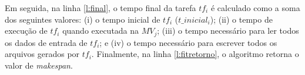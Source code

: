 Em seguida, na linha \ref{l:final}, o tempo final da tarefa $tf_i$ é calculado como a soma dos seguintes valores: (i) o tempo inicial de $tf_i$ ($t\_inicial_i$); (ii) o tempo de execução de $tf_i$ quando executada na $MV_j$; (iii) o tempo necessário para ler todos os dados de entrada de $tf_i$; e (iv) o tempo necessário para escrever todos os arquivos gerados por $tf_i$. Finalmente, na linha \ref{l:fitretorno}, o algoritmo retorna o valor de \textit{makespan}.



